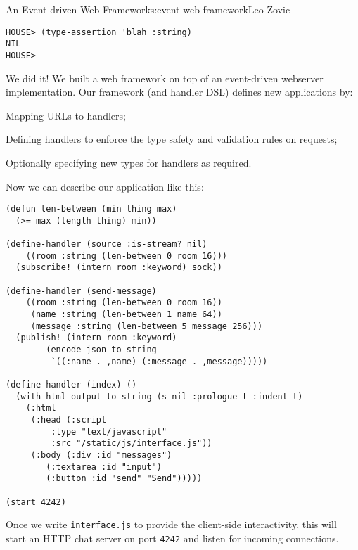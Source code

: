 \begin{aosachapter}{An Event-driven Web Framework}{s:event-web-framework}{Leo Zovic}
\begin{verbatim}
HOUSE> (type-assertion 'blah :string)
NIL
HOUSE>
\end{verbatim}

\label{all-together-now}

We did it! We built a web framework on top of an event-driven webserver
implementation. Our framework (and handler DSL) defines new applications
by:

\begin{aosaitemize}

\item
  Mapping URLs to handlers;
\item
  Defining handlers to enforce the type safety and validation rules on
  requests;
\item
  Optionally specifying new types for handlers as required.
\end{aosaitemize}

Now we can describe our application like this:

\begin{verbatim}
(defun len-between (min thing max)
  (>= max (length thing) min))

(define-handler (source :is-stream? nil)
    ((room :string (len-between 0 room 16)))
  (subscribe! (intern room :keyword) sock))

(define-handler (send-message)
    ((room :string (len-between 0 room 16))
     (name :string (len-between 1 name 64))
     (message :string (len-between 5 message 256)))
  (publish! (intern room :keyword)
        (encode-json-to-string
         `((:name . ,name) (:message . ,message)))))

(define-handler (index) ()
  (with-html-output-to-string (s nil :prologue t :indent t)
    (:html
     (:head (:script
         :type "text/javascript"
         :src "/static/js/interface.js"))
     (:body (:div :id "messages")
        (:textarea :id "input")
        (:button :id "send" "Send")))))

(start 4242)
\end{verbatim}

Once we write \texttt{interface.js} to provide the client-side
interactivity, this will start an HTTP chat server on port \texttt{4242}
and listen for incoming connections.

\end{aosachapter}
